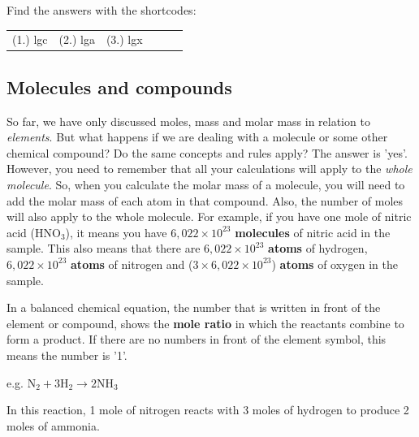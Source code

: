       

    
    \label{m38717*cid5}
\par {} Find the answers with the shortcodes:
 \par \begin{tabular}[h]{cccccc}
 (1.) lgc  &  (2.) lga  &  (3.) lgx  & \end{tabular}



            \subsection{ Molecules and compounds}
            \nopagebreak
            
      
      \label{m38717*id278284}So far, we have only discussed moles, mass and molar mass in relation to \textsl{elements}. But what happens if we are dealing with a molecule or some other chemical compound? Do the same concepts and rules apply? The answer is 'yes'. However, you need to remember that all your calculations will apply to the \textsl{whole molecule}. So, when you calculate the molar mass of a molecule, you will need to add the molar mass of each atom in that compound. Also, the number of moles will also apply to the whole molecule. For example, if you have one mole of nitric acid (\begin{math}\mathrm{HNO}{}_{3}\end{math}), it means you have \begin{math}6,022\ensuremath{\times}{10}^{23}\end{math} \textbf{molecules} of nitric acid in the sample. This also means that there are \begin{math}6,022\ensuremath{\times}{10}^{23}\end{math} \textbf{atoms} of hydrogen, \begin{math}6,022\ensuremath{\times}{10}^{23}\end{math} \textbf{atoms} of nitrogen and (\begin{math}3\ensuremath{\times}6,022\ensuremath{\times}{10}^{23}\end{math}) \textbf{atoms} of oxygen in the sample.\par 
      \label{m38717*id278429}In a balanced chemical equation, the number that is written in front of the element or compound, shows the \textbf{mole ratio} in which the reactants combine to form a product. If there are no numbers in front of the element symbol, this means the number is '1'.\par 
      \label{m38717*id278442}e.g. \begin{math}{\mathrm{N}}_{2}+3{\mathrm{H}}_{2}\to 2\mathrm{N}{\mathrm{H}}_{3}\end{math}\par 
      \label{m38717*id278488}In this reaction, 1 mole of nitrogen reacts with 3 moles of hydrogen to produce 2 moles of ammonia.\par 
\label{m38717*secfhsst!!!underscore!!!id566}\vspace{.5cm} 
      
